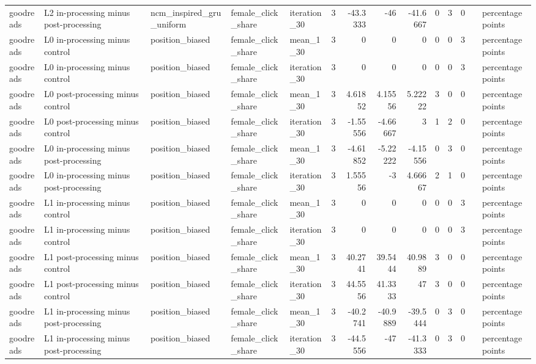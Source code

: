 \begin{table}[htbp!]
\begin{tabular}{lllllrrrrrrrll}
goodreads & L2 in-processing minus post-processing & ncm\_inspired\_gru\_uniform & female\_click\_share & iteration\_30 & 3 & -43.3333 & -46 & -41.6667 & 0 & 3 & 0 &  & percentage points \\
goodreads & L0 in-processing minus control & position\_biased & female\_click\_share & mean\_1\_30 & 3 & 0 & 0 & 0 & 0 & 0 & 3 &  & percentage points \\
goodreads & L0 in-processing minus control & position\_biased & female\_click\_share & iteration\_30 & 3 & 0 & 0 & 0 & 0 & 0 & 3 &  & percentage points \\
goodreads & L0 post-processing minus control & position\_biased & female\_click\_share & mean\_1\_30 & 3 & 4.61852 & 4.15556 & 5.22222 & 3 & 0 & 0 &  & percentage points \\
goodreads & L0 post-processing minus control & position\_biased & female\_click\_share & iteration\_30 & 3 & -1.55556 & -4.66667 & 3 & 1 & 2 & 0 &  & percentage points \\
goodreads & L0 in-processing minus post-processing & position\_biased & female\_click\_share & mean\_1\_30 & 3 & -4.61852 & -5.22222 & -4.15556 & 0 & 3 & 0 &  & percentage points \\
goodreads & L0 in-processing minus post-processing & position\_biased & female\_click\_share & iteration\_30 & 3 & 1.55556 & -3 & 4.66667 & 2 & 1 & 0 &  & percentage points \\
goodreads & L1 in-processing minus control & position\_biased & female\_click\_share & mean\_1\_30 & 3 & 0 & 0 & 0 & 0 & 0 & 3 &  & percentage points \\
goodreads & L1 in-processing minus control & position\_biased & female\_click\_share & iteration\_30 & 3 & 0 & 0 & 0 & 0 & 0 & 3 &  & percentage points \\
goodreads & L1 post-processing minus control & position\_biased & female\_click\_share & mean\_1\_30 & 3 & 40.2741 & 39.5444 & 40.9889 & 3 & 0 & 0 &  & percentage points \\
goodreads & L1 post-processing minus control & position\_biased & female\_click\_share & iteration\_30 & 3 & 44.5556 & 41.3333 & 47 & 3 & 0 & 0 &  & percentage points \\
goodreads & L1 in-processing minus post-processing & position\_biased & female\_click\_share & mean\_1\_30 & 3 & -40.2741 & -40.9889 & -39.5444 & 0 & 3 & 0 &  & percentage points \\
goodreads & L1 in-processing minus post-processing & position\_biased & female\_click\_share & iteration\_30 & 3 & -44.5556 & -47 & -41.3333 & 0 & 3 & 0 &  & percentage points \\

\end{tabular}
\end{table}
